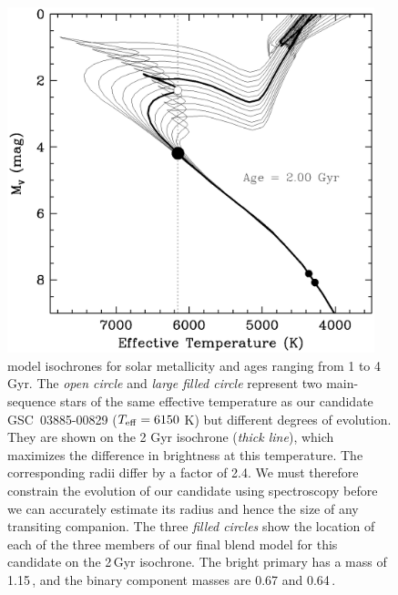 \begin{figure}
\begin{center}
\includegraphics[width=0.95\textwidth]{3_f2}
\caption[Location of blend model components on isochrones]{\citet{Girardi_Bressan_Bertelli:aas:2000a} model isochrones
  for solar metallicity and ages ranging from 1 to 4 Gyr.
  The \textit{open circle} and \textit{large filled circle} represent two main-sequence stars of the same effective temperature as our candidate
  \mbox{GSC 03885-00829} ($T_{\rm eff} = 6150$ K) but different
  degrees of evolution. They are shown on the 2 Gyr isochrone ({\it thick
  line}), which maximizes the difference in brightness at this
  temperature. The corresponding radii differ by a factor of 2.4. We
  must therefore constrain the evolution of our candidate using
  spectroscopy before we can accurately estimate its radius and hence
  the size of any transiting companion. The three \textit{filled circles} show
  the location of each of the three members of our final blend model
  for this candidate on the 2\,Gyr isochrone. The bright primary has a
  mass of 1.15\,\msun, and the binary component masses are
  0.67 and 0.64\,\msun.}
\label{cha:gsc:fig:isochrones}
\end{center}
\end{figure}


